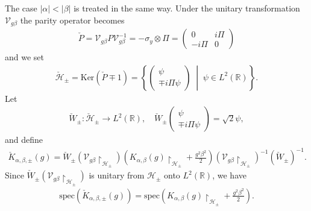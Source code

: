 \documentclass[12pt,dvipdfmx]{article}
\newcommand{\RR}{\mathbb{R}}
\newcommand{\cH}{\mathcal{H}}
\newcommand{\Ker}{\mathrm{Ker}}
\newcommand{\spec}{\mathrm{spec}}
\begin{document}
The case $|\alpha|<|\beta|$ is treated in the same way. Under the unitary transformation
$
    \mathcal{V}_{g\beta}
$
the parity operator becomes
\begin{align*}
    \check{P}
    =
    \mathcal{V}_{g\beta} P \mathcal{V}_{g\beta}^{-1}
    =
    -\sigma_y \otimes \Pi
    =
    \begin{pmatrix} 0 & i\Pi\\ -i\Pi & 0 \end{pmatrix}
\end{align*}
and we set 
\begin{align*}
    \check{\cH}_\pm
    =
    \Ker(\check{P} \mp 1)
    =
    \left\{
        \begin{pmatrix} \psi\\ \mp i\Pi\psi \end{pmatrix}
        \;\middle|\;
        \psi \in L^2(\RR)
    \right\}.
\end{align*}
Let
\begin{align*}
    \check{W}_\pm: \check{\cH}_\pm \longrightarrow L^2(\RR),
    \quad
    \check{W}_\pm
    \begin{pmatrix} \psi\\ \mp i\Pi\psi \end{pmatrix}
    =
    \sqrt2\psi,
\end{align*}
and define
\begin{align*}
    \check{K}_{\alpha,\beta,\pm}(g)
=
    \check{W}_\pm
    \left(
        \mathcal V_{g\beta}\upharpoonright_{\cH _\pm}
    \right)
    \left(
        K_{\alpha,\beta}(g)\upharpoonright_{\cH _\pm}
        +
        \frac{g^2\beta^2}{2}
    \right)
    \left(
        \mathcal V_{g\beta}\upharpoonright_{\cH _\pm}
    \right)^{-1}
    (\check{W}_\pm)^{-1}.
\end{align*}
Since 
$
    \check{W}_\pm
    \left(
        \mathcal V_{g\beta}\upharpoonright_{\cH _\pm}
    \right)
$
is unitary from $\cH_\pm$ onto $L^2(\RR)$, we have
\begin{align*}
    \spec\left(\check{K}_{\alpha,\beta,\pm}(g)\right)
    =
    \spec
    \left(
        K_{\alpha,\beta}(g)\upharpoonright_{\cH _\pm}
        +
        \frac{g^2\beta^2}{2}
    \right).
\end{align*}
%
\end{document}

